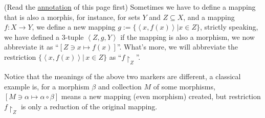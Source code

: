 \documentclass{article}
\begin{document}
\begin{Mark}
	(Read the \hyperref[sign]{annotation} of this page first) Sometimes we have to define a mapping that is also a morphis, for instance, for sets $Y$ and $Z\subseteq X$, and a mapping $f:X\to Y$, we define a new mapping $g:=\{\left<x,f(x)\right>|x\in Z\}$, strictly speaking, we have defined a 3-tuple $\left<Z,g,Y\right>$ if the mapping is also a morphism, we now abbreviate it as ``$[Z\ni x\mapsto f(x)]$''. What's more, we will abbreviate the restriction $\{\left<x,f(x)\right>|\,x\in Z\}$ as ``$f\upharpoonright_Z$''.

	Notice that the meanings of the above two markers are different, a classical example is, for a morphism $\beta$ and collection $M$ of some morphisms, $[M\ni\alpha\mapsto\alpha\circ\beta]$ means a new mapping (even morphism) created, but restriction $f\upharpoonright_Z$ is only a reduction of the original mapping.
\end{Mark}
\end{document}
